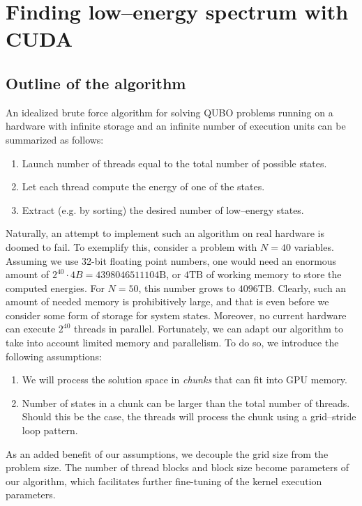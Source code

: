 
\section{Finding low--energy spectrum with CUDA}
\subsection{Outline of the algorithm}
An idealized brute force algorithm for solving QUBO problems running on a
hardware with infinite storage and an infinite number of execution units can be
summarized as follows:
\begin{enumerate}
  \item Launch number of threads equal to the total number of possible states.
  \item Let each thread compute the energy of one of the states.
  \item Extract (e.g. by sorting) the desired number of low--energy states.
\end{enumerate}
Naturally, an attempt to implement such an algorithm on real hardware is doomed
to fail. To exemplify this, consider a problem with $N=40$ variables. Assuming
we use 32-bit floating point numbers, one would need an enormous amount of
$2^{40}\cdot 4B = 4398046511104\mbox{B}$, or $4\mbox{TB}$ of working memory to
    store the computed energies. For $N=50$, this number grows to $4096\mbox{TB}$.
    Clearly, such an amount of needed memory is prohibitively large, and that is
    even before we consider some form of storage for system states. Moreover, no
    current hardware can execute $2^{40}$ threads in parallel. Fortunately, we can
    adapt our algorithm to take into account limited memory and parallelism. To do
    so, we introduce the following assumptions:
    \begin{enumerate}
      \item We will process the solution space in \emph{chunks} that can fit into GPU
        memory.
      \item Number of states in a chunk can be larger than the total number of threads.
        Should this be the case, the threads will process the chunk using a
        grid--stride loop pattern.
    \end{enumerate}
    As an added benefit of our assumptions, we decouple the grid size from the
    problem size. The number of thread blocks and block size become parameters of
    our algorithm, which facilitates further fine-tuning of the kernel execution
    parameters.

